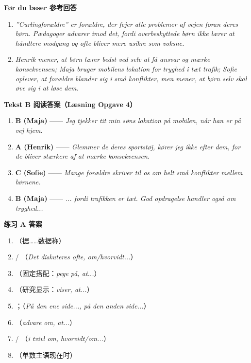 \begin{answerbox}
\textbf{Før du læser 参考回答}
\begin{enumerate}
  \item \textit{”Curlingforældre” er forældre, der fejer alle problemer af vejen foran deres børn. Pædagoger advarer imod det, fordi overbeskyttede børn ikke lærer at håndtere modgang og ofte bliver mere usikre som voksne.}
  \item \textit{Henrik mener, at børn lærer bedst ved selv at få ansvar og mærke konsekvensen; Maja bruger mobilens lokation for tryghed i tæt trafik; Sofie oplever, at forældre blander sig i små konflikter, men mener, at børn selv skal øve sig i at løse dem.}
\end{enumerate}

\textbf{Tekst B 阅读答案（Læsning Opgave 4）}
\begin{enumerate}
  \item \textbf{B (Maja)} —— \textit{Jeg tjekker tit min søns lokation på mobilen, når han er på vej hjem.}
  \item \textbf{A (Henrik)} —— \textit{Glemmer de deres sportstøj, kører jeg ikke efter dem, for de bliver stærkere af at mærke konsekvensen.}
  \item \textbf{C (Sofie)} —— \textit{Mange forældre skriver til os om helt små konflikter mellem børnene.}
  \item \textbf{B (Maja)} —— \textit{... fordi trafikken er tæt. God opdragelse handler også om tryghed...}
\end{enumerate}

\textbf{练习 A 答案}
\begin{enumerate}
  \item {}（据……数据称）
  \item {} / （\textit{Det diskuteres ofte, om/hvorvidt...}）
  \item {}（固定搭配：\textit{pege på, at...}）
  \item {}（研究显示：\textit{viser, at...}）
  \item {}；（\textit{På den ene side..., på den anden side...}）
  \item {}（\textit{advare om, at...}）
  \item {} / （\textit{i tvivl om, hvorvidt/om...}）
  \item {}（单数主语现在时）
\end{enumerate}


\end{answerbox}
